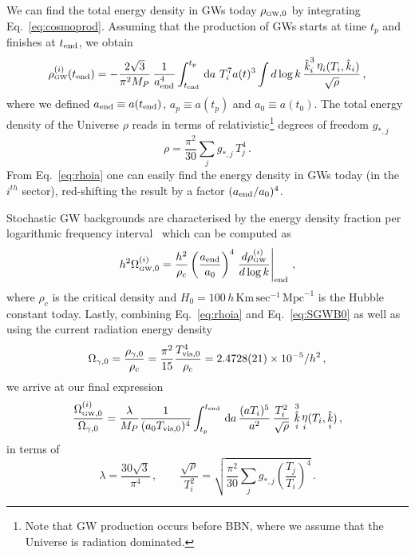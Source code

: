 \documentclass[a4paper,11pt]{article}
\DeclareMathOperator{\dif}{\, \text{d} \hspace*{-0.065cm}}
\DeclareMathOperator{\heta}{\eta}
\DeclareMathOperator{\hk}{\hat{\mathit{k}}}
\begin{document}
We can find the total energy density in GWs today $\rho_{\text{\tiny GW},0}$ by integrating Eq.~\eqref{eq:cosmoprod}.
Assuming that the production of GWs starts at time $t_p$ and finishes at $t_{\rm end}$, we obtain
\begin{equation}\label{eq:rhoia}
\rho_{\text{\tiny GW}}^{(i)}(t_{\rm end}) = -\frac{2\sqrt{3}}{\pi^2M_{P}}\, \dfrac{1}{a^4_{\rm end}}\int_{t_{\rm end}}^{t_p}{\dif a \/\ T_i^7 a(t)^3 \int d\log k \, \frac{\hk_i^3\heta_i(T_i,\hk_i)}{\sqrt{\rho}} }\,,
\end{equation}
where we defined $a_{\rm end} \equiv a(t_{\rm end})$, $a_p \equiv a(t_p)$ and $a_0 \equiv a(t_0)$.
The total energy density of the Universe $\rho$ reads in terms of relativistic\footnote{Note that GW production occurs before BBN, where we assume that the Universe is radiation dominated.} degrees of freedom $g_{*,j}$
\begin{equation}
\rho=\frac{\pi^2}{30}\sum_j g_{*,j}\, T_j^4\, .
\end{equation}
From Eq.~\eqref{eq:rhoia} one can easily find the energy density in GWs today (in the $i^{th}$ sector), red-shifting the result by a factor $(a_{\rm end}/a_0)^4$.

Stochastic GW backgrounds are characterised by the energy density fraction per logarithmic frequency interval~\cite{Caprini:2018mtu} which can be computed as
\begin{equation}\label{eq:SGWB0} 
h^2 \Omega^{(i)}_{\text{\tiny GW},0} = \frac{h^2}{\rho_c} \left(\frac{a_{\rm end}}{a_0}\right)^4 \left.\frac{d \rho^{(i)}_{\text{\tiny GW}}}{d \log k}\right|_{\rm end} \,,
\end{equation}
where $\rho_c$ is the critical density and $H_0 = 100 \, h \, \text{Km} \, \text{sec}^{-1} \, \text{Mpc}^{-1}$ is the Hubble constant today.
Lastly, combining Eq.~\eqref{eq:rhoia} and Eq.~\eqref{eq:SGWB0} as well as using the current radiation energy density~\cite{Fixsen:2009ug}
\begin{equation}
\Omega_{\gamma, 0}=\frac{\rho_{\gamma,0}}{\rho_{c}}=\frac{\pi^2}{15}\frac{T_{{\rm vis},0}^4}{\rho_{c}}=2.4728(21)\times 10^{-5}/h^2\, ,
\end{equation}
we arrive at our final expression
\begin{equation}\label{eq:ampl}
    \dfrac{ \Omega^{(i)}_{\text{\tiny{GW}},0}}{ \Omega_{\gamma,0}}=  \frac{\lambda}{M_{P}}  \frac{1}{(a_0 T_{{\rm vis},0})^4}
    \int_{t_p}^{t_{\rm end}}\dif a \, \frac{(aT_i)^5}{a^2}\, \dfrac{T_{i}^{2}}{\sqrt{\rho}} \, \hk_i^3 \heta_i (T_i, \hk_i ) \,,
\end{equation}
in terms of
\begin{equation}
\lambda=\dfrac{30 \sqrt{3}}{\pi^{4}}\, , \qquad \dfrac{\sqrt{\rho}}{T_{i}^{2}}=\sqrt{\dfrac{\pi^{2}}{30}\sum_j{g_{*,j}\left ( \frac{T_j}{T_{i}} \right )^4}}\, .
\end{equation}
\end{document}
